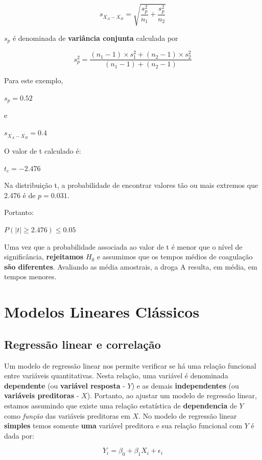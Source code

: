 \documentclass[
]{book}
\begin{document}
\[s_{\overline{X_A}-\overline{X_B}} = \sqrt{\frac{s^2_{p}}{n_1} + \frac{s^2_{p}}{n_2}}\]

\(s_p\) é denominada de \textbf{variância conjunta} calculada por

\[s^2_p = \frac{(n_1 - 1) \times s^2_1 + (n_2 - 1) \times s^2_2}{(n_1 - 1) + (n_2 - 1)}\]

Para este exemplo,

\(s_p = 0.52\)

e

\(s_{\overline{X_A}-\overline{X_B}} = 0.4\)

O valor de t calculado é:

\(t_c = -2.476\)

Na distribuição t, a probabilidade de encontrar valores tão ou mais extremos que 2.476 é de \(p = 0.031\).

Portanto:

\(P(|t| \ge 2.476) \le 0.05\)

Uma vez que a probabilidade associada ao valor de t é menor que o nível de significância, \textbf{rejeitamos} \(H_0\) e assumimos que os tempos médios de coagulação \textbf{são diferentes}. Avaliando as média amostrais, a droga A resulta, em média, em tempos menores.

\hypertarget{part-modelos-lineares-cluxe1ssicos}{%
\part{Modelos Lineares Clássicos}\label{part-modelos-lineares-cluxe1ssicos}}

\hypertarget{regressao}{%
\chapter{Regressão linear e correlação}\label{regressao}}

Um modelo de regressão linear nos permite verificar se há uma relação funcional entre variáveis quantitativas. Nesta relação, uma variável é denominada \textbf{dependente} (ou \textbf{variável resposta} - \(Y\)) e as demais \textbf{independentes} (ou \textbf{variáveis preditoras} - \(X\)). Portanto, ao ajustar um modelo de regressão linear, estamos assumindo que existe uma relação estatística de \textbf{dependencia} de \(Y\) como \emph{função} das variáveis preditoras em \(X\). No modelo de regressão linear \textbf{simples} temos somente \textbf{uma} variável preditora e sua relação funcional com \(Y\) é dada por:

\[Y_i = \beta_0 + \beta_1X_i + \epsilon_i\]
\end{document}
